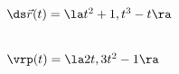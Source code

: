 {$\ds \vec r(t) = \la t^2+1,t^3-t\ra$
}
{
\begin{minipage}{\linewidth}
\\
$\vrp(t) = \la 2t,3t^2-1\ra$
\end{minipage}
}

